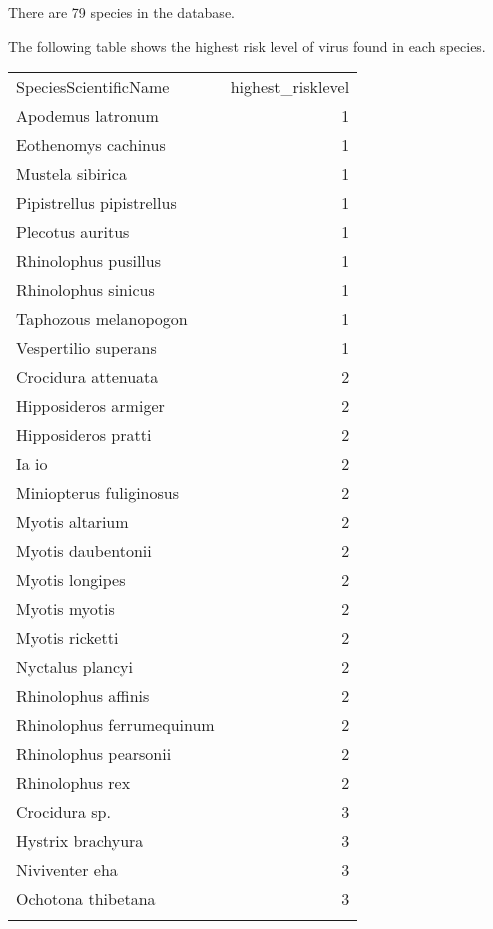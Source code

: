 \documentclass[11pt,article,oneside]{article}
\begin{document}
There are 79 species in the database.

The following table shows the highest risk level of virus found in each
species.

\begin{longtable}[c]{@{}lr@{}}
\toprule\addlinespace
SpeciesScientificName & highest\_risklevel
\\\addlinespace
\midrule\endhead
Apodemus latronum & 1
\\\addlinespace
Eothenomys cachinus & 1
\\\addlinespace
Mustela sibirica & 1
\\\addlinespace
Pipistrellus pipistrellus & 1
\\\addlinespace
Plecotus auritus & 1
\\\addlinespace
Rhinolophus pusillus & 1
\\\addlinespace
Rhinolophus sinicus & 1
\\\addlinespace
Taphozous melanopogon & 1
\\\addlinespace
Vespertilio superans & 1
\\\addlinespace
Crocidura attenuata & 2
\\\addlinespace
Hipposideros armiger & 2
\\\addlinespace
Hipposideros pratti & 2
\\\addlinespace
Ia io & 2
\\\addlinespace
Miniopterus fuliginosus & 2
\\\addlinespace
Myotis altarium & 2
\\\addlinespace
Myotis daubentonii & 2
\\\addlinespace
Myotis longipes & 2
\\\addlinespace
Myotis myotis & 2
\\\addlinespace
Myotis ricketti & 2
\\\addlinespace
Nyctalus plancyi & 2
\\\addlinespace
Rhinolophus affinis & 2
\\\addlinespace
Rhinolophus ferrumequinum & 2
\\\addlinespace
Rhinolophus pearsonii & 2
\\\addlinespace
Rhinolophus rex & 2
\\\addlinespace
Crocidura sp. & 3
\\\addlinespace
Hystrix brachyura & 3
\\\addlinespace
Niviventer eha & 3
\\\addlinespace
Ochotona thibetana & 3
\\\addlinespace

\end{longtable}
\end{document}
